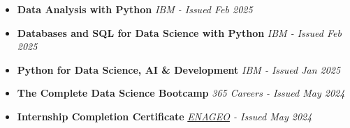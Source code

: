 \documentclass[letterpaper,11pt]{article}
\makeatletter
\newcommand{\resumeItem}[1]{
  \item\small{
    {#1 \vspace{-2pt}}
  }
}
\newcommand{\resumeSubheading}[4]{
  \vspace{-2pt}\item
    \begin{tabular*}{0.97\textwidth}[t]{l@{\extracolsep{\fill}}r}
      \textbf{#1} & #2 \\
      \textit{\small#3} & \textit{\small #4} \\
    \end{tabular*}\vspace{-7pt}
}
\newcommand{\resumeSubHeadingListStart}{\begin{itemize}[leftmargin=0.15in, label={}]}
\newcommand{\resumeItemListStart}{\begin{itemize}}
\newcommand{\resumeItemListEnd}{\end{itemize}\vspace{-5pt}}
\makeatother
\begin{document}
\begin{itemize}
    \item \textbf{Data Analysis with Python}  
    \textit{IBM - Issued Feb 2025}  




    \item \textbf{
Databases and SQL for Data Science with Python}  
    \textit{IBM - Issued Feb 2025}  









    \item \textbf{
Python for Data Science, AI & Development}  
    \textit{IBM - Issued Jan 2025}  













    \item \textbf{
The Complete Data Science Bootcamp}  
    \textit{365 Careers - Issued May 2024}  


 \item \textbf{
Internship Completion Certificate}  
    \textit{\href{https://www.enageo.com/}{ENAGEO} - Issued May 2024}  
\end{itemize}



      
\end{document}
